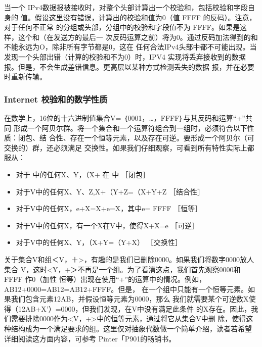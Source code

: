 当一个 IPv4数据报被接收时，对整个头部计算出一个校验和，包括校验和字段自身的
值。假设这里没有错误，计算出的校验和值为0（值 FFFF 的反码）。注意，对于任何不正常
的分组或头部，分组中的校验和字段值不为 FFFF。如果是这样，这个和（在发送方的最后一
次反码运算之前）将为0。通过反码加法得到的和不能永远为O，除非所有字节都是0，这在
任何合法IPv4头部中都不可能出现。当发现一个头部出错（计算的校验和不为0）时，IPV4
实现将丢弃接收到的数据报。但是，不会生成差错信息。更高层以某种方式检测丢失的数据
报，并在必要时重新传输。

\subsubsection{Internet 校验和的数学性质}
在数学上，16位的十六进制值集合V= ｛0001，\dots，FFFF｝与其反码和运算“+”共同
形成一个阿贝尔群。将一个集合和一个运算符组合到一组时，必须符合以下性质：闭包、结
合性、存在一个恒等元素，以及存在可逆。要形成一个阿贝尔（可交换的）群，还必须满足
交换性。如果我们仔细观察，可看到所有特性实际上都服从：

\begin{itemize}
  \item 对于 中的任何X、Y，（X+ 在 中           ［闭包］
  \item 对于V中的任何X、Y、Z,X+（Y+Z=（X+Y+Z    ［结合性］
  \item 对于V中的任何X，e+X=X+e=X，其中e= FFFF      ［恒等］
  \item 对于V中的任何X，有一个X在V中，使得X+X=e         ［可逆］
  \item 对于V中的任何X、Y，（X+Y=（Y+X）                ［交换性］
\end{itemize}

关于集合V和组＜V，＋>，有趣的是我们已删除0000。如果我们将数字0000放人集合
V，这时<Y，+＞不再是一个组。为了看清这点，我们首先观察0000和 FFFF 作0（加性
恒等）出现在使用“+”的运算中的情况。例如，AB12+0000=AB12=AB12+FFFF。但是，
在一个组中只能有一个恒等元素。如果我们包含元素12AB，并假设恒等元素为0000，那么
我们就需要某个可逆数X使得（12AB+X'）=0000，但我们发现，在V中没有满足此条件
的X存在。因此，我们需要排除0000作为<V，+>中的恒等元素，通过将它从集合V中删
除，使得这种结构成为一个满足要求的组。这里仅对抽象代数做一个简单介绍，读者若希望
详细阅读这方面内容，可参考 Pinter「P901的畅销书。

